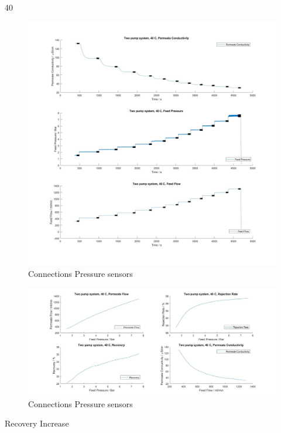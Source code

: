 40


\begin{figure}[H]
    \centering
    \includegraphics[width=1.1\textwidth]{FeedPumpIncrease40}
    \caption{Connections Pressure sensors}
    \label{fig:PressConn}
\end{figure}


\begin{figure}[H]
    \centering
    \includegraphics[width=1.1\textwidth]{FeedPumpIncrease40Key}
    \caption{Connections Pressure sensors}
    \label{fig:PressConn}
\end{figure}

Recovery Increase

